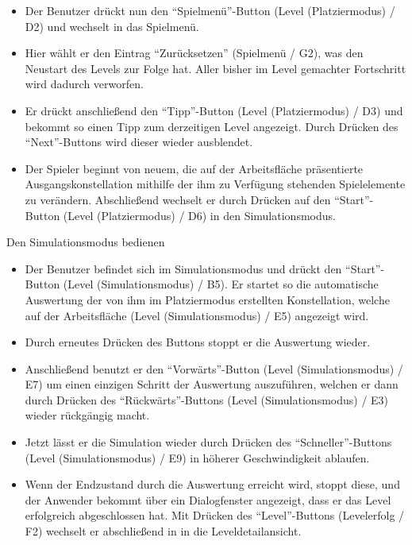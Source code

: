 \begin{requirements}
\begin{itemize}
  			\item Der Benutzer drückt nun den "`Spielmenü"'-Button (Level (Platziermodus) / D2) und wechselt in das Spielmenü.
  			
  			\item Hier wählt er den Eintrag "`Zurücksetzen"' (Spielmenü / G2), was den Neustart des Levels zur Folge hat. Aller bisher im Level gemachter Fortschritt wird dadurch verworfen.
  			
  			\item Er drückt anschließend den "`Tipp"'-Button (Level (Platziermodus) / D3) und bekommt so einen Tipp zum derzeitigen Level angezeigt. Durch Drücken des "`Next"'-Buttons wird dieser wieder ausblendet.
  			
  			\item Der Spieler beginnt von neuem, die auf der Arbeitsfläche präsentierte Ausgangskonstellation mithilfe der ihm zu Verfügung stehenden Spielelemente zu verändern. Abschließend wechselt er durch Drücken auf den "`Start"'-Button (Level (Platziermodus) / D6) in den Simulationsmodus.
  	\end{itemize}
  	
  	
  	
  	 Den Simulationsmodus bedienen
  	
	
	\begin{itemize}
	
  			\item Der Benutzer befindet sich im Simulationsmodus und drückt den "`Start"'-Button (Level (Simulationsmodus) / B5). Er startet so die automatische Auswertung der von ihm im Platziermodus erstellten Konstellation, welche auf der Arbeitsfläche (Level (Simulationsmodus) / E5) angezeigt wird.
  			
  			\item Durch erneutes Drücken des Buttons stoppt er die Auswertung wieder.
  			
  			\item Anschließend benutzt er den "`Vorwärts"'-Button (Level (Simulationsmodus) / E7) um einen einzigen Schritt der Auswertung auszuführen, welchen er dann durch Drücken des "`Rückwärts"'-Buttons (Level (Simulationsmodus) / E3) wieder rückgängig macht.
  			
			\item Jetzt lässt er die Simulation wieder durch Drücken des "`Schneller"'-Buttons (Level (Simulationsmodus) / E9) in höherer Geschwindigkeit ablaufen.
  			
  			\item Wenn der Endzustand durch die Auswertung erreicht wird, stoppt diese, und der Anwender bekommt über ein Dialogfenster angezeigt, dass er das Level erfolgreich abgeschlossen hat. Mit Drücken des "`Level"'-Buttons (Levelerfolg / F2) wechselt er abschließend in in die Leveldetailansicht.
  			

\end{itemize}
\end{requirements}

